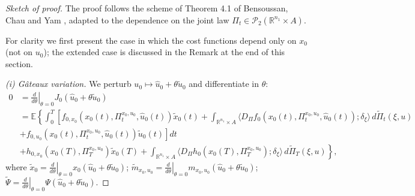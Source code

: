 \documentclass[12pt]{article}
\theoremstyle{definition}
\begin{document}
\begin{proof}[Sketch of proof]
The proof follows the scheme of Theorem 4.1 of Bensoussan, Chau and Yam \cite{bensoussan2014mfgdominating}, adapted to the dependence on the joint law $\Pi_t \in \mathcal{P}_2(\mathbb{R}^{n_1} \times A)$.

For clarity we first present the case in which the cost functions depend only on \(x_0\) (not on \(u_0\)); the extended case is discussed in the Remark at the end of this section.

\emph{(i) G\^{a}teaux variation.} We perturb \(u_0\mapsto \hat u_0+\theta\tilde u_0\) and differentiate in \(\theta\):
    \begin{equation}
        \label{Derivada Gateaux}
        \begin{aligned}
            0 &= \left.\frac{d}{d\theta}\right|_{\theta=0}J_0(\hat{u}_0+\theta\tilde{u}_0) \\
            &= \mathbb{E}\left\{ \int_0^T \left[f_{0,x_0}(x_0(t),\Pi^{x_0,u_0}_t,\hat{u}_0(t))\tilde{x}_0(t)+\int_{\mathbb{R}^{n_1}\times A} \Big\langle D_\Pi f_0(x_0(t),\Pi^{x_0,u_0}_t,\hat{u}_0(t));\delta_\xi\Big\rangle\,d\tilde\Pi_t(\xi,u) \right.\right.\\
            &\left.+ f_{0,u_0}(x_0(t),\Pi^{x_0,u_0}_t,\hat{u}_0(t))\tilde{u}_0(t)\right]dt \\
            &\left.+ h_{0,x_0}(x_0(T),\Pi^{x_0,u_0}_T)\tilde{x}_0(T)+\int_{\mathbb{R}^{n_1}\times A} \Big\langle D_\Pi h_0(x_0(T),\Pi^{x_0,u_0}_T);\delta_\xi\Big\rangle\,d\tilde\Pi_T(\xi,u) \right\},
        \end{aligned}
    \end{equation}
where $\tilde{x}_0=\left.\frac{d}{d\theta}\right|_{\theta=0}x_0(\hat{u}_0+\theta\tilde{u}_0)$; $\tilde{m}_{x_0,u_0}=\left.\frac{d}{d\theta}\right|_{\theta=0}m_{x_0,u_0}(\hat{u}_0+\theta\tilde{u}_0)$; $\tilde{\Psi}=\left.\frac{d}{d\theta}\right|_{\theta=0}\Psi(\hat{u}_0+\theta\tilde{u}_0)$.


\end{proof}
\end{document}
